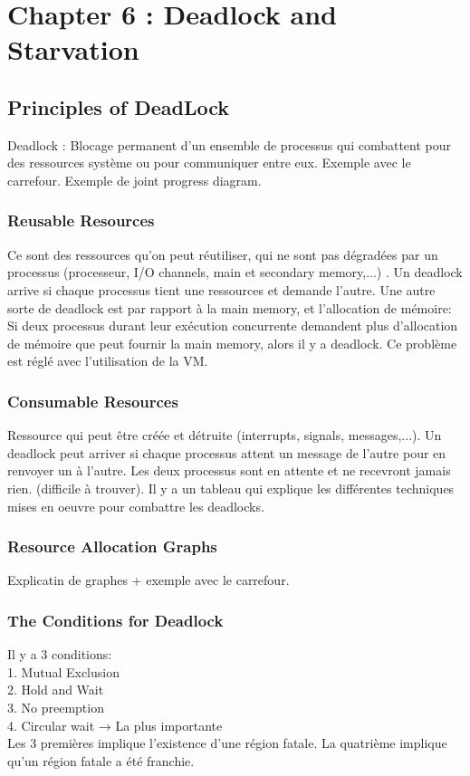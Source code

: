 
\section{Chapter 6 : Deadlock and Starvation}

\subsection{Principles of DeadLock}
Deadlock : Blocage permanent d'un ensemble de processus qui combattent pour des ressources système ou pour communiquer entre eux. Exemple avec le carrefour. Exemple de joint progress diagram.
\subsubsection{Reusable Resources}
Ce sont des ressources qu'on peut réutiliser, qui ne sont pas dégradées par un processus (processeur, I/O channels, main et secondary memory,...) . Un deadlock arrive si chaque processus tient une ressources et demande l'autre. Une autre sorte de deadlock est par rapport à la main memory, et l'allocation de mémoire: Si deux processus durant leur exécution concurrente demandent plus d'allocation de mémoire que peut fournir la main memory, alors il y a deadlock. Ce problème est réglé avec l'utilisation de la VM.
\subsubsection{Consumable Resources}
Ressource qui peut être créée et détruite (interrupts, signals, messages,...). Un deadlock peut arriver si chaque processus attent un message de l'autre pour en renvoyer un à l'autre. Les deux processus sont en attente et ne recevront jamais rien. (difficile à trouver). Il y a un tableau \cite[p.~265]{stallings} qui explique les différentes techniques mises en oeuvre pour combattre les deadlocks.
\subsubsection{Resource Allocation Graphs}
Explicatin de graphes + exemple avec le carrefour.
\subsubsection{The Conditions for Deadlock}
Il y a 3 conditions: \\
1. Mutual Exclusion \\
2. Hold and Wait\\
3. No preemption\\
4. Circular wait → La plus importante\\
Les 3 premières implique l'existence d'une région fatale. La quatrième implique qu'un région fatale a été franchie.
